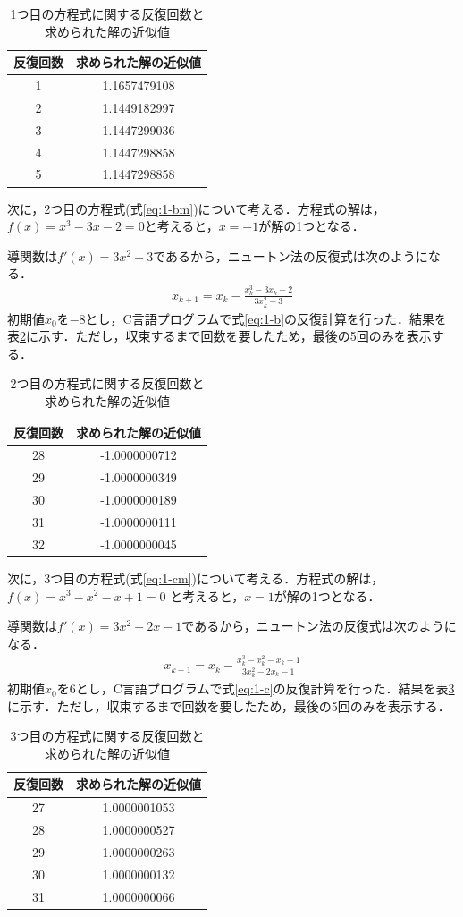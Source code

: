 \documentclass[12pt]{jarticle}
\renewcommand  \[  {\begin{eqnarray}}
\renewcommand  \]  {\end{eqnarray}}
\begin{document}
\begin{table}[t]
 \caption{1つ目の方程式に関する反復回数と求められた解の近似値}
 \label{tab:1-a}
 \center
\begin{tabular}{|c|c|}
\hline
反復回数 &求められた解の近似値 \\
\hline
1  & 1.1657479108 \\
2  & 1.1449182997 \\
3  & 1.1447299036 \\
4  & 1.1447298858 \\
5  & 1.1447298858 \\
\hline
 \end{tabular}
\end{table}


次に，2つ目の方程式(式\ref{eq:1-bm})について考える．方程式の解は，$f(x)=x^3-3x-2=0$と考えると，$x=-1$が解の1つとなる．

導関数は$f\prime(x)=3x^2-3$であるから，ニュートン法の反復式は次のようになる．
\[
\label{eq:1-b}
x_{k+1}=x_k- \frac{x_k^3-3x_k-2}{3x_k^2-3}
\]
初期値$x_0$を$-8$とし，C言語プログラムで式\ref{eq:1-b}の反復計算を行った．結果を表\ref{tab:1-b}に示す．ただし，収束するまで回数を要したため，最後の5回のみを表示する．


\begin{table}[t]
 \caption{2つ目の方程式に関する反復回数と求められた解の近似値}
 \label{tab:1-b}
 \center
\begin{tabular}{|c|c|}
\hline
反復回数 &求められた解の近似値 \\
\hline
28  & -1.0000000712 \\
29  & -1.0000000349 \\
30  & -1.0000000189 \\
31  & -1.0000000111 \\
32  & -1.0000000045 \\
\hline
 \end{tabular}
\end{table}


次に，3つ目の方程式(式\ref{eq:1-cm})について考える．方程式の解は，$f(x)=x^3-x^2-x+1=0$
と考えると，$x=1$が解の1つとなる．

導関数は$f\prime(x)=3x^2-2x-1$であるから，ニュートン法の反復式は次のようになる．
\[
\label{eq:1-c}
x_{k+1}=x_k- \frac{x_k^3-x_k^2-x_k+1}{3x_k^2-2x_k-1}
\]
初期値$x_0$を$6$とし，C言語プログラムで式\ref{eq:1-c}の反復計算を行った．結果を表\ref{tab:1-c}に示す．ただし，収束するまで回数を要したため，最後の5回のみを表示する．


\begin{table}[t]
 \caption{3つ目の方程式に関する反復回数と求められた解の近似値}
 \label{tab:1-c}
 \center
\begin{tabular}{|c|c|}
\hline
反復回数 &求められた解の近似値 \\
\hline
27  & 1.0000001053 \\
28  & 1.0000000527 \\
29  & 1.0000000263 \\
30  & 1.0000000132 \\
31  & 1.0000000066 \\
\hline
 \end{tabular}
\end{table}
\end{document}

